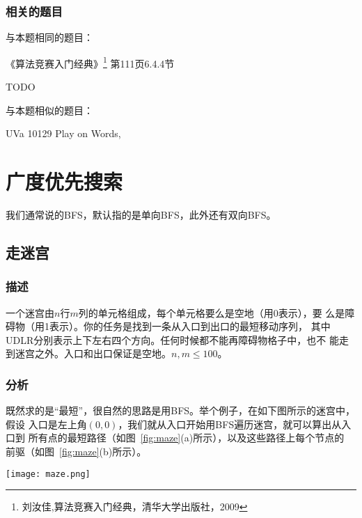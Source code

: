 \subsubsection{相关的题目}
与本题相同的题目：
\begindot
\item 《算法竞赛入门经典》\footnote{刘汝佳,算法竞赛入门经典，清华大学出版社，2009} 第111页6.4.4节
\item  TODO
\myenddot

与本题相似的题目：
\begindot
\item  UVa 10129 Play on Words, 
\myenddot

\section{广度优先搜索} %

我们通常说的BFS，默认指的是单向BFS，此外还有双向BFS。

\subsection{走迷宫}

\subsubsection{描述}
一个迷宫由$n$行$m$列的单元格组成，每个单元格要么是空地（用0表示），要
么是障碍物（用1表示）。你的任务是找到一条从入口到出口的最短移动序列，
其中UDLR分别表示上下左右四个方向。任何时候都不能再障碍物格子中，也不
能走到迷宫之外。入口和出口保证是空地。$n,m \leq 100$。

\subsubsection{分析}
既然求的是“最短”，很自然的思路是用BFS。举个例子，在如下图所示的迷宫中，假设
入口是左上角$(0,0)$，我们就从入口开始用BFS遍历迷宫，就可以算出从入口到
所有点的最短路径（如图~\ref{fig:maze}(a)所示），以及这些路径上每个节点的
前驱（如图~\ref{fig:maze}(b)所示）。

\begin{center}
\texttt{[image: maze.png]}\\
\label{fig:maze}
\end{center}

